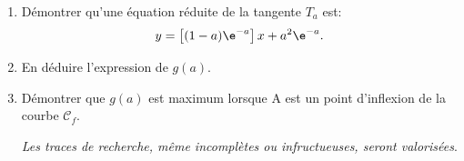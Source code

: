 \begin{enumerate}
	\begin{enumerate}
		\item Démontrer qu'une équation réduite de la tangente $T_a$ est:
\[y = \left[(1- a)\e^{-a}\right]x + a^2\e^{-a}.\]
		\item En déduire l'expression de $g(a)$.
		\item Démontrer que $g(a)$ est maximum lorsque A est un point d'inflexion de la courbe $\mathcal{C}_f$.
		
\emph{Les traces de recherche, même incomplètes ou infructueuses, seront valorisées}.
	\end{enumerate}
\end{enumerate}

\bigskip
